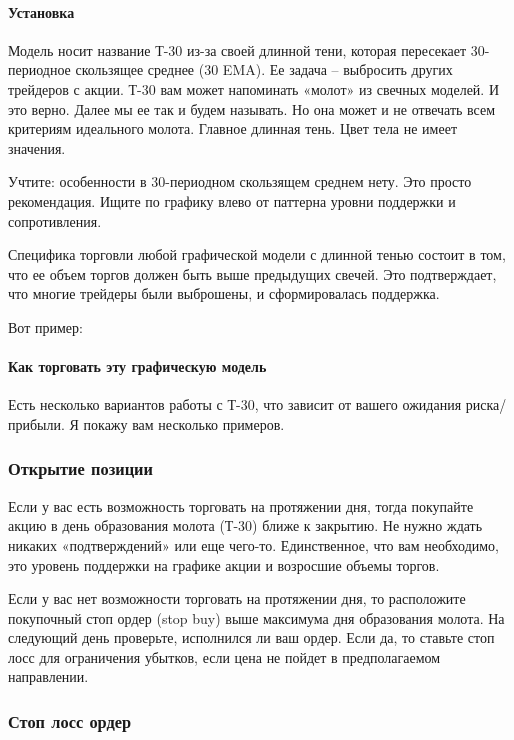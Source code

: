 \documentclass{book}
\begin{document}
\paragraph{Установка}

Модель носит название Т-30 из-за своей длинной тени, которая пересекает 30-периодное скользящее среднее (30 EMA). Ее задача – выбросить других трейдеров с акции. Т-30 вам может напоминать «молот» из свечных моделей. И это верно. Далее мы ее так и будем называть. Но она может и не отвечать всем критериям идеального молота. Главное длинная тень. Цвет тела не имеет значения.

Учтите: особенности в 30-периодном скользящем среднем нету. Это просто рекомендация. Ищите по графику влево от паттерна уровни поддержки и сопротивления.

Специфика торговли любой графической модели с длинной тенью состоит в том, что ее объем торгов должен быть выше предыдущих свечей. Это подтверждает, что многие трейдеры были выброшены, и сформировалась поддержка.

Вот пример:

\paragraph{Как торговать эту графическую модель}

Есть несколько вариантов работы с Т-30, что зависит от вашего ожидания
риска/прибыли. Я покажу вам несколько примеров.

\subsubsection{Открытие позиции}

Если у вас есть возможность торговать на протяжении дня, тогда покупайте акцию в день образования молота (Т-30) ближе к закрытию. Не нужно ждать никаких «подтверждений» или еще чего-то. Единственное, что вам необходимо, это уровень поддержки на графике акции и возросшие объемы торгов.

Если у вас нет возможности торговать на протяжении дня, то расположите покупочный стоп ордер (stop buy) выше максимума дня образования молота. На следующий день проверьте, исполнился ли ваш ордер. Если да, то ставьте стоп лосс для ограничения убытков, если цена не пойдет в предполагаемом направлении.

\subsubsection{Стоп лосс ордер}
\end{document}

